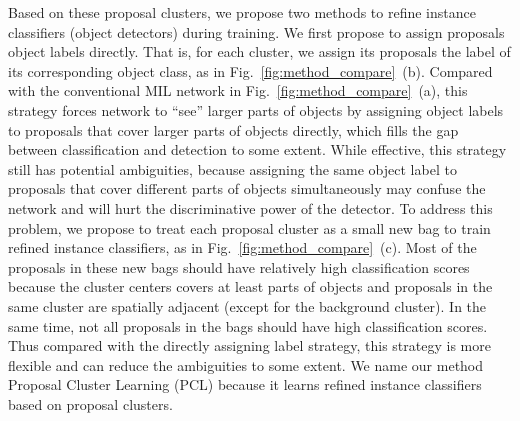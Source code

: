 \documentclass[10pt,journal,compsoc]{IEEEtran}
\def\methodname{PCL}
\begin{document}
Based on these proposal clusters, we propose two methods to refine instance classifiers (object detectors) during training.
We first propose to assign proposals object labels directly.
That is, for each cluster, we assign its proposals the label of its corresponding object class,
as in Fig.~\ref{fig:method_compare}~(b).
Compared with the conventional MIL network in Fig.~\ref{fig:method_compare}~(a),
this strategy forces network to ``see'' larger parts of objects by assigning object labels to proposals that cover larger parts of objects directly,
which fills the gap between classification and detection to some extent.
While effective, this strategy still has potential ambiguities,
because assigning the same object label to proposals that cover different parts of objects simultaneously may confuse the network
and will hurt the discriminative power of the detector.
To address this problem, we propose to treat each proposal cluster as a small new bag to train refined instance classifiers, as in Fig.~\ref{fig:method_compare}~(c).
Most of the proposals in these new bags should have relatively high classification scores
because the cluster centers covers at least parts of objects and proposals in the same cluster are spatially adjacent (except for the background cluster).
In the same time,
not all proposals in the bags should have high classification scores.
Thus compared with the directly assigning label strategy, this strategy is more flexible and can reduce the ambiguities to some extent.
We name our method Proposal Cluster Learning (\methodname) because it learns refined instance classifiers based on proposal clusters.
\end{document}
